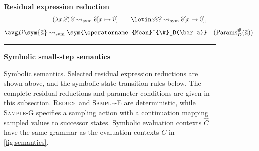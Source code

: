 \begin{figure}[H]
\centering
\small
\setlength{\jot}{2pt}
\setlength{\abovedisplayskip}{3pt}
\setlength{\belowdisplayskip}{3pt}


\textbf{Residual expression reduction}
\[
\begin{gathered}
  (\lambda x.\widehat e)\,\widehat v
  \rightsquigarrow_{\mathrm{sym}}
  \widehat e[x\mapsto\widehat v]
  \qquad
  \letin x{\widehat v}{\widehat e}
  \rightsquigarrow_{\mathrm{sym}}
  \widehat e[x\mapsto\widehat v],
  \\[3pt]
  \avg D{\sym{\bar a}}
  \rightsquigarrow_{\mathrm{sym}}
  \sym{\operatorname{Mean}^{\#}_D(\bar a)}
  \quad(\operatorname{Params}^{\#}_D(\bar a)).
\end{gathered}
\]

\vspace{2pt}
{\color{black!20}\rule{\textwidth}{0.4pt}}
\vspace{1pt}


\textbf{Symbolic small-step semantics}
\vspace{-5pt}

\vspace{-7pt}

\caption{Symbolic semantics. Selected residual expression reductions
are shown above, and the symbolic state transition rules below.
The complete residual reductions and parameter conditions are given in this subsection.
\textsc{Reduce} and \textsc{Sample-E} are deterministic, while \textsc{Sample-G} specifies a sampling
action with a continuation mapping sampled values to
successor states. Symbolic evaluation contexts $\widehat C$
have the same grammar as the evaluation contexts $C$ in
\cref{fig:semantics}.}
\label{fig:symbolic-semantics}
\end{figure}